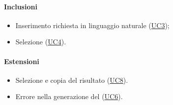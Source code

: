 \paragraph*{Inclusioni}
\begin{itemize}
  \item Inserimento richiesta in linguaggio naturale (\hyperref[UC3]{UC3});
  \item Selezione  (\hyperref[UC4]{UC4}).
\end{itemize}

\paragraph*{Estensioni}
\begin{itemize}
  \item Selezione e copia del  risultato (\hyperref[UC8]{UC8}).
  \item Errore nella generazione del  (\hyperref[UC6]{UC6}).
\end{itemize}
